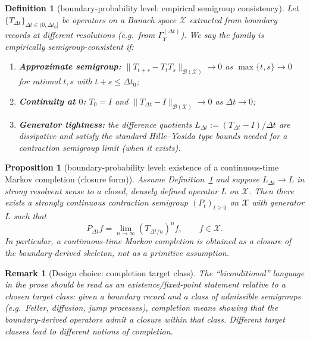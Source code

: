\documentclass[11pt]{article}
\newtheorem{definition}{Definition}
\newtheorem{proposition}{Proposition}
\newtheorem{remark}{Remark}
\newcommand{\Bcal}{\mathcal{B}}
\newcommand{\Xcal}{\mathcal{X}}
\begin{document}
\label{sec:completion-closure}
\begin{definition}[boundary-probability level: empirical semigroup consistency]
\label{def:empirical-semigroup-consistency-v2}
Let $\{T_{\Delta t}\}_{\Delta t\in(0,\Delta t_0]}$ be operators on a Banach space $\Xcal$ extracted from boundary records at different resolutions (e.g.\ from $\Gamma_Y^{(\Delta t)}$).
We say the family is \emph{empirically semigroup-consistent} if:
\begin{enumerate}[label=(MC\arabic*),leftmargin=1.8em]
\item \textbf{Approximate semigroup:} $\|T_{t+s}-T_tT_s\|_{\Bcal(\Xcal)}\to 0$ as $\max\{t,s\}\to 0$ for rational $t,s$ with $t+s\le \Delta t_0$;
\item \textbf{Continuity at $0$:} $T_0=I$ and $\|T_{\Delta t}-I\|_{\Bcal(\Xcal)}\to 0$ as $\Delta t\to 0$;
\item \textbf{Generator tightness:} the difference quotients $L_{\Delta t}:=(T_{\Delta t}-I)/\Delta t$ are dissipative and satisfy the standard Hille--Yosida type bounds needed for a contraction semigroup limit (when it exists).
\end{enumerate}
\end{definition}

\begin{proposition}[boundary-probability level: existence of a continuous-time Markov completion (closure form)]
\label{prop:continuous-markov-completion-v2}
Assume Definition~\ref{def:empirical-semigroup-consistency-v2} and suppose $L_{\Delta t}\to L$ in strong resolvent sense to a closed, densely defined operator $L$ on $\Xcal$.
Then there exists a strongly continuous contraction semigroup $(P_t)_{t\ge 0}$ on $\Xcal$ with generator $L$ such that
\[
P_{\Delta t} f = \lim_{n\to\infty} (T_{\Delta t/n})^n f,
\qquad f\in\Xcal.
\]
In particular, a continuous-time Markov completion is obtained as a \emph{closure} of the boundary-derived skeleton, not as a primitive assumption.
\end{proposition}

\begin{remark}[Design choice: completion target class]
The ``biconditional'' language in the prose should be read as an existence/fixed-point statement relative to a chosen target class:
\emph{given} a boundary record and a class of admissible semigroups (e.g.\ Feller, diffusion, jump processes), completion means showing that the boundary-derived operators admit a closure within that class.
Different target classes lead to different notions of completion.
\end{remark}
\end{document}
